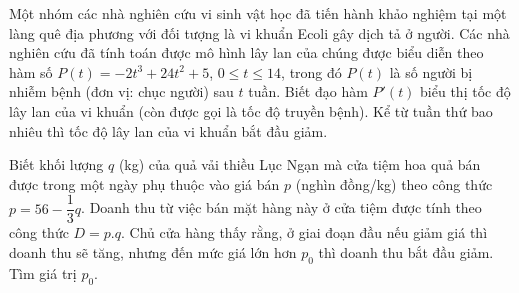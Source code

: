 \begin{ex}%
	Một nhóm các nhà nghiên cứu vi sinh vật học đã tiến hành khảo nghiệm tại một làng quê địa phương với đối tượng là vi khuẩn Ecoli gây dịch tả ở người. Các nhà nghiên cứu đã tính toán được mô hình lây lan của chúng được biểu diễn theo hàm số $P\left(t \right)=-2t^3+24t^2+5$, $0\le t\le 14$, trong đó $P(t)$ là số người bị nhiễm bệnh (đơn vị: chục người) sau $t$ tuần. Biết đạo hàm $P'\left(t \right)$ biểu thị tốc độ lây lan của vi khuẩn (còn được gọi là tốc độ truyền bệnh). Kể từ tuần thứ bao nhiêu thì tốc độ lây lan của vi khuẩn bắt đầu giảm.
\end{ex}

\begin{ex}%
	Biết khối lượng $q$ (kg) của quả vải thiều Lục Ngạn mà cửa tiệm hoa quả bán được trong một ngày phụ thuộc vào giá bán $p$ (nghìn đồng/kg) theo công thức $p=56-\dfrac{1}{3}q$. Doanh thu từ việc bán mặt hàng này ở cửa tiệm được tính theo công thức $D=p.q$. Chủ cửa hàng thấy rằng, ở giai đoạn đầu nếu giảm giá thì doanh thu sẽ tăng, nhưng đến mức giá lớn hơn $p_0$ thì doanh thu bắt đầu giảm. Tìm giá trị $p_0$.
\end{ex}

